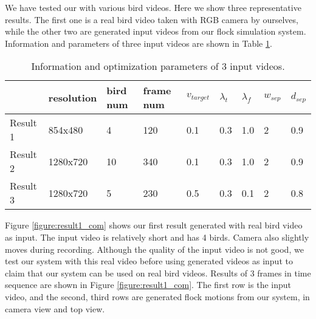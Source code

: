 We have tested our with various bird videos. Here we show three representative results. The first one is a real bird video taken with RGB camera by ourselves, while the other two are generated input videos from our flock simulation system.  Information and parameters of three input videos are shown in Table \ref{table:result}.


\begin{table}[h]
\begin{tabular}{|l|l|l|l|l|l|l|l|l|}
\hline
  & resolution & bird num & frame num & $v_{target}$ & $\lambda_{t}$ & $\lambda_{f}$ & $w_{sep}$ & $d_{sep}$ \\ \hline
Result 1& 854x480    & 4           & 120          & 0.1          & 0.3           & 1.0           & 2         & 0.9       \\ \hline
Result 2& 1280x720   & 10          & 340          & 0.1          & 0.3           & 1.0          & 2         & 0.9         \\ \hline
Result 3& 1280x720   & 5           & 230          & 0.5          & 0.3           & 0.1           & 2         & 0.8       \\ \hline
\end{tabular}
\caption{Information and optimization parameters of 3 input videos.}
\label{table:result}
\end{table}




Figure \ref{figure:result1_com} shows our first result generated with real bird video as input. The input video is relatively short and has 4 birds. Camera also slightly moves during recording. Although the quality of the input video is not good, we test our system with this real video before using generated videos as input to claim that our system can be used on real bird videos. Results of 3 frames in time sequence are shown in Figure \ref{figure:result1_com}. The first row is the input video, and the second, third rows are generated flock motions from our system, in camera view and top view.



